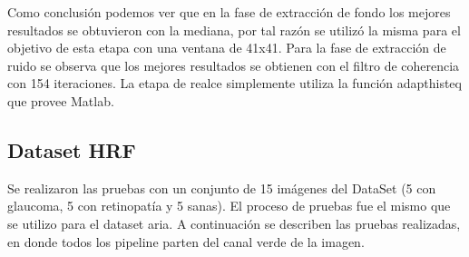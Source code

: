 Como conclusi\'on podemos ver que en la fase de extracci\'on de fondo los mejores resultados se obtuvieron con la mediana, por tal raz\'on se utiliz\'o la misma para el objetivo de esta etapa con una ventana de 41x41. Para la fase de extracci\'on de ruido se observa que los mejores resultados se obtienen con el filtro de coherencia con 154 iteraciones. La etapa de realce simplemente utiliza la funci\'on adapthisteq que provee Matlab.\\




\subsection{Dataset HRF}

Se realizaron las pruebas con un conjunto de 15 imágenes del DataSet (5 con glaucoma, 5 con retinopatía y 5 sanas).
El proceso de pruebas fue el mismo que se utilizo para el dataset aria.  A continuación se describen las pruebas realizadas, en donde todos los pipeline parten del canal verde de la imagen.
